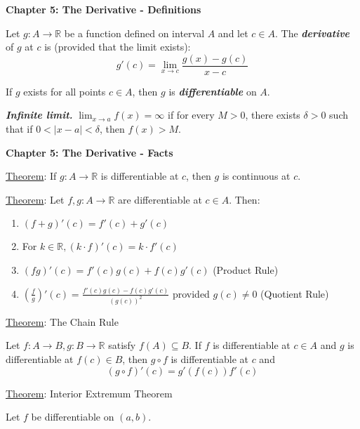 \documentclass[12pt]{article}
\newcommand{\RR}{\mathbb{R}} %
\newcommand\abs[1]{\left| #1 \right|} %
\newcommand\parens[1]{\left( #1 \right)} %
\newcommand\defword[1]{\textit{\textbf{#1}}}
\begin{document}
\textbf{Chapter 5: The Derivative - Definitions}

\hrulefill

Let $g : A \rightarrow \RR$ be a function defined on interval $A$ and let $c \in A$. The \defword{derivative} of $g$ at $c$ is (provided that the limit exists):
\[
g'(c) = \lim \limits_{x \rightarrow c} \frac{g(x) - g(c)}{x - c}
\]

If $g$ exists for all points $c \in A$, then $g$ is \defword{differentiable} on $A$.

\hrulefill

\defword{Infinite limit.} $\lim_{x \rightarrow a} f(x) = \infty$ if for every $M > 0$, there exists $\delta > 0$ such that if $0 < \abs{x - a} < \delta$, then $f(x) > M$.

\pagebreak

\textbf{Chapter 5: The Derivative - Facts}

\hrulefill

\underline{Theorem}: If $g : A \rightarrow \RR$ is differentiable at $c$, then $g$ is continuous at $c$.

\hrulefill

\underline{Theorem}: Let $f, g : A \rightarrow \RR$ are differentiable at $c \in A$. Then:

\begin{enumerate}
\item $(f + g)'(c) = f'(c) + g'(c)$

\item For $k \in \RR, (k \cdot f)'(c) = k \cdot f'(c)$

\item $(fg)'(c) = f'(c)g(c) + f(c)g'(c)$ (Product Rule)

\item $\parens{\frac{f}{g}}'(c) = \frac{f'(c)g(c) - f(c)g'(c)}{(g(c))^2}$ provided $g(c) \ne 0$ (Quotient Rule)
\end{enumerate}

\hrulefill

\underline{Theorem}: The Chain Rule

Let $f : A \rightarrow B, g : B \rightarrow \RR$ satisfy $f(A) \subseteq B$. If $f$ is differentiable at $c \in A$ and $g$ is differentiable at $f(c) \in B$, then $g \circ f$ is differentiable at $c$ and
\[
(g \circ f)'(c) = g'(f(c)) f'(c)
\]

\hrulefill

\underline{Theorem}: Interior Extremum Theorem

Let $f$ be differentiable on $(a, b)$.
\end{document}
